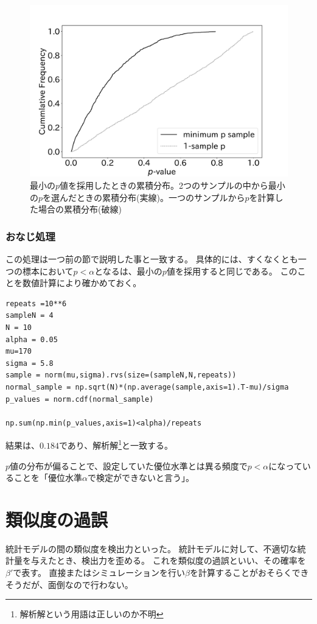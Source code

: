 \begin{figure}
  \begin{center}
    \includegraphics[width=15cm]{./image/04_/Minimum-p-values-choice-exmepriment.pdf}
    \caption{最小の$p$値を採用したときの累積分布。2つのサンプルの中から最小の$p$を選んだときの累積分布(実線)。一つのサンプルから$p$を計算した場合の累積分布(破線)}
        \label{fig:minimum_p_value_choice}
    \end{center}
\end{figure}

\subsubsection{おなじ処理}
この処理は一つ前の節で説明した事と一致する。
具体的には、すくなくとも一つの標本において$p<\alpha$となるは、最小の$p$値を採用すると同じである。
このことを数値計算により確かめておく。
\begin{lstlisting}
repeats =10**6
sampleN = 4
N = 10
alpha = 0.05
mu=170
sigma = 5.8
sample = norm(mu,sigma).rvs(size=(sampleN,N,repeats))
normal_sample = np.sqrt(N)*(np.average(sample,axis=1).T-mu)/sigma
p_values = norm.cdf(normal_sample)

np.sum(np.min(p_values,axis=1)<alpha)/repeats
\end{lstlisting}
結果は、$0.184$であり、解析解\footnote{解析解という用語は正しいのか不明}と一致する。

\begin{defi}
  $p$値の分布が偏ることで、設定していた優位水準とは異る頻度で$p<\alpha$になっていることを「優位水準$\alpha$で検定ができないと言う」。
\end{defi}

\section{類似度の過誤}
統計モデルの間の類似度を検出力といった。
統計モデルに対して、不適切な統計量を与えたとき、検出力を歪める。
これを類似度の過誤といい、その確率を$\beta'$で表す。
直接またはシミュレーションを行い$\beta$を計算することがおそらくできそうだが、面倒なので行わない。



